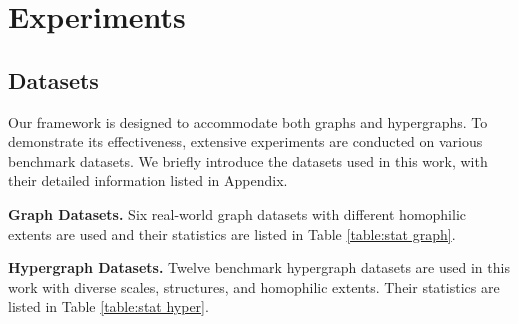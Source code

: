 \documentclass[review]{elsarticle}
\begin{document}
\section{Experiments}

\subsection{Datasets}

Our framework is designed to accommodate both graphs and hypergraphs. To demonstrate its effectiveness, extensive experiments are conducted on various benchmark datasets. We briefly introduce the datasets used in this work, with their detailed information listed in Appendix.

\textbf{Graph Datasets.} Six real-world graph datasets with different homophilic extents are used and their statistics are listed in Table \ref{table:stat graph}.

\begin{table}[htbp]
  \centering
  \caption{\textbf{Statistics of six graph datasets.}}
\end{table}

\textbf{Hypergraph Datasets.} Twelve benchmark hypergraph datasets are used in this work with diverse scales, structures, and homophilic extents. Their statistics are listed in Table \ref{table:stat hyper}.
\end{document}
